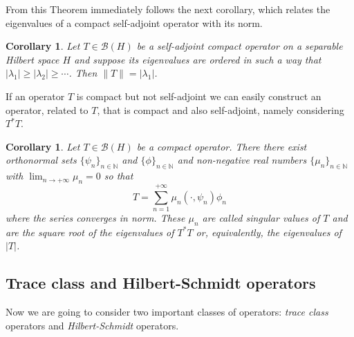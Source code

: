 \documentclass[corpo=11pt, stile=classica, tipotesi=custom,
greek, evenboxes, english]{toptesi}
\numberwithin{equation}{chapter}
\newtheorem{cor}[teo]{Corollary}
\theoremstyle{remark}
\newcommand{\N}{\mathbb{N}} %
\newcommand{\B}{\mathscr{B}} %
\begin{document}
From this Theorem immediately follows the next corollary, which relates the eigenvalues of a compact self-adjoint operator with its norm.
\begin{cor}\label{norm is greatest eigenvalue}
	Let $T \in \B(H)$ be a self-adjoint compact operator on a separable Hilbert space $H$ and suppose its eigenvalues are ordered in such a way that $|\lambda_1| \geq |\lambda_2| \geq \cdots$. Then $\|T\| = |\lambda_1|$.
\end{cor}

If an operator $T$ is compact but not self-adjoint we can easily construct an operator, related to $T$, that is compact and also self-adjoint, namely considering $T^*T$.
\begin{cor}\label{canonical form for compact operators corollary}
	Let $T \in \B(H)$ be a compact operator. There there exist orthonormal sets $\{\psi_n\}_{n \in \N}$ and $\{\phi\}_{n \in \N}$ and non-negative real numbers $\{\mu_n\}_{n \in \N}$ with $\lim_{n \rightarrow +\infty} \mu_n = 0$ so that
	\begin{equation}\label{canonical form for compact operators formula}
		T = \sum_{n=1}^{+\infty} \mu_n (\cdot , \psi_n)\phi_n
	\end{equation}
	where the series converges in norm. These $\mu_n$ are called \emph{singular values} of $T$ and are the square root of the eigenvalues of $T^*T$ or, equivalently, the eigenvalues of $|T|$.
\end{cor}

\subsection{Trace class and Hilbert-Schmidt operators}
Now we are going to consider two important classes of operators: \emph{trace class} operators and \emph{Hilbert-Schmidt} operators.
\end{document}
